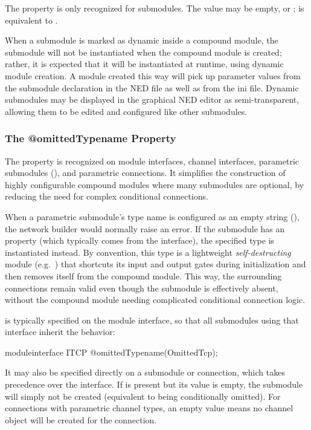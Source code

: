 The  property is only recognized for submodules. The value may
be empty,  or ;  is equivalent to .

When a submodule is marked as dynamic inside a compound module, the submodule
will not be instantiated when the compound module is created; rather, it is
expected that it will be instantiated at runtime, using dynamic module creation.
A module created this way will pick up parameter values from the submodule
declaration in the NED file as well as from the ini file. Dynamic submodules
may be displayed in the graphical NED editor as semi-transparent, allowing them
to be edited and configured like other submodules.

\subsubsection{The @omittedTypename Property}
\label{sec:ned-ref:omittedtypename-property}

The  property is recognized on module interfaces,
channel interfaces, parametric submodules (), and parametric
connections.  It simplifies the construction of highly configurable compound
modules where many submodules are optional, by reducing the need for complex
conditional connections.

When a parametric submodule's type name is configured as an empty string
(), the network builder would normally raise an error. If the submodule
has an  property (which typically comes from the
interface), the specified type is instantiated instead. By convention, this type
is a lightweight \textit{self-destructing} module (e.g.\ ) that
shortcuts its input and output gates during initialization and then removes
itself from the compound module. This way, the surrounding connections remain
valid even though the submodule is effectively absent, without the compound
module needing complicated conditional connection logic.

 is typically specified on the module interface, so that
all submodules using that interface inherit the behavior:

\begin{ned}
moduleinterface ITCP {
    @omittedTypename(OmittedTcp);
}
\end{ned}

It may also be specified directly on a submodule or connection, which takes
precedence over the interface. If  is present but its
value is empty, the submodule will simply not be created (equivalent to being
conditionally omitted). For connections with parametric channel types, an empty
value means no channel object will be created for the connection.


